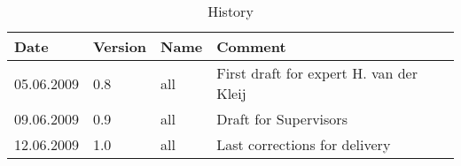\pagebreak
\begin{table}
	\centering
	\begin{tabular}{|p{}|p{}|p{}|p{}|}
		\hline
		\bfseries Date & \bfseries Version & \bfseries Name & \bfseries Comment \\
		\hline
		\hline 05.06.2009 & 0.8 & all & First draft for expert H. van der Kleij \\
		\hline 09.06.2009 & 0.9 & all & Draft for Supervisors \\
		\hline 12.06.2009 & 1.0 & all & Last corrections for delivery \\
		\hline
	\end{tabular}
	\caption{History}
\end{table}
\pagebreak
